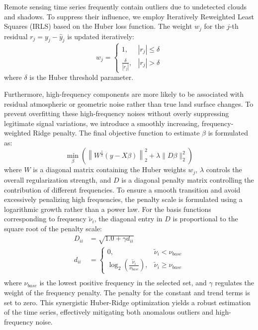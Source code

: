 \documentclass[letterpaper,journal]{IEEEtran}
\begin{document}
Remote sensing time series frequently contain outliers due to undetected clouds and shadows. To suppress their influence, we employ Iteratively Reweighted Least Squares (IRLS) based on the Huber loss function. The weight $w_j$ for the $j$-th residual $r_j = y_j - \hat{y}_j$ is updated iteratively:
\begin{equation}
\label{eq:huber}
w_j = \begin{cases}
1, & |r_j| \le \delta \\
\frac{\delta}{|r_j|}, & |r_j| > \delta
\end{cases}
\end{equation}
where $\delta$ is the Huber threshold parameter.

Furthermore, high-frequency components are more likely to be associated with residual atmospheric or geometric noise rather than true land surface changes. To prevent overfitting these high-frequency noises without overly suppressing legitimate signal variations, we introduce a smoothly increasing, frequency-weighted Ridge penalty. The final objective function to estimate $\beta$ is formulated as:
\begin{equation}
\label{eq:objective}
\min_{\beta} \left( \left\|W^{\frac{1}{2}}(y - X\beta)\right\|_2^2 + \lambda \|D\beta\|_2^2 \right)
\end{equation}
where $W$ is a diagonal matrix containing the Huber weights $w_j$, $\lambda$ controls the overall regularization strength, and $D$ is a diagonal penalty matrix controlling the contribution of different frequencies. To ensure a smooth transition and avoid excessively penalizing high frequencies, the penalty scale is formulated using a logarithmic growth rather than a power law. For the basis functions corresponding to frequency $\tilde{\nu}_i$, the diagonal entry in $D$ is proportional to the square root of the penalty scale:
\begin{equation}
\label{eq:ridge_penalty}
\begin{split}
    D_{ii} &= \sqrt{1.0 + \gamma d_{ii} } \\
    d_{ii} &= {
        \begin{cases}
        0, & \tilde{\nu}_i < \nu_{base} \\
        \log_2\left(\frac{\tilde{\nu}_i}{\nu_{base}}\right), & \tilde{\nu}_i \ge \nu_{base}
        \end{cases}
    } \\
\end{split}
\end{equation}
where $\nu_{base}$ is the lowest positive frequency in the selected set, and $\gamma$ regulates the weight of the frequency penalty. The penalty for the constant and trend terms is set to zero. This synergistic Huber-Ridge optimization yields a robust estimation of the time series, effectively mitigating both anomalous outliers and high-frequency noise.
\end{document}
